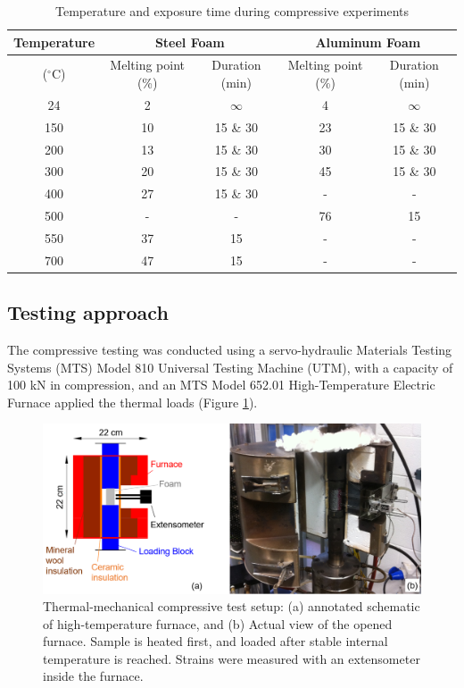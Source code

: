 \documentclass[review]{elsarticle}
\begin{document}
\begin{table}[htbp]
	\centering
	\caption{Temperature and exposure time during compressive experiments}
	\begin{tabular}{ccccc}
		\toprule
		{Temperature} & \multicolumn{2}{c}{Steel Foam}  & \multicolumn{2}{c}{Aluminum Foam} \\
		\midrule
		($^{\circ}\mathrm{C}$) & Melting point (\%) & Duration (min) & Melting point (\%) & Duration (min) \\
		\midrule
		24    & 2     & $\infty$     & 4     & $\infty$ \\
		150   & 10    & 15 \& 30 & 23    & 15 \& 30 \\
		200   & 13    & 15 \& 30 & 30    & 15 \& 30 \\
		300   & 20    & 15 \& 30 & 45    & 15 \& 30 \\
		400   & 27    & 15 \& 30 & -     & - \\
		500   & -     & -     & 76    & 15 \\
		550   & 37    & 15    & -     & - \\
		700   & 47    & 15    & -     & - \\
		\bottomrule
	\end{tabular}%
	\label{Tab1}%
\end{table}%

\subsection{Testing approach}

The compressive testing was conducted using a servo-hydraulic Materials Testing Systems (MTS) Model 810 Universal Testing Machine (UTM), with a capacity of 100 kN in compression, and an MTS Model 652.01 High-Temperature Electric Furnace applied the thermal loads (Figure \ref{MTSFurnace}).

\begin{figure}[htbp]
	\begin{center}
		\includegraphics[width=0.95\linewidth]{Tex-Figures/Fig06.png}
		\caption{Thermal-mechanical compressive test setup: (a) annotated schematic of high-temperature furnace, and (b) Actual view of the opened furnace. Sample is heated first, and loaded after stable internal temperature is reached. Strains were measured with an extensometer inside the furnace.}
		\label{MTSFurnace}
	\end{center}
\end{figure}
\end{document}

